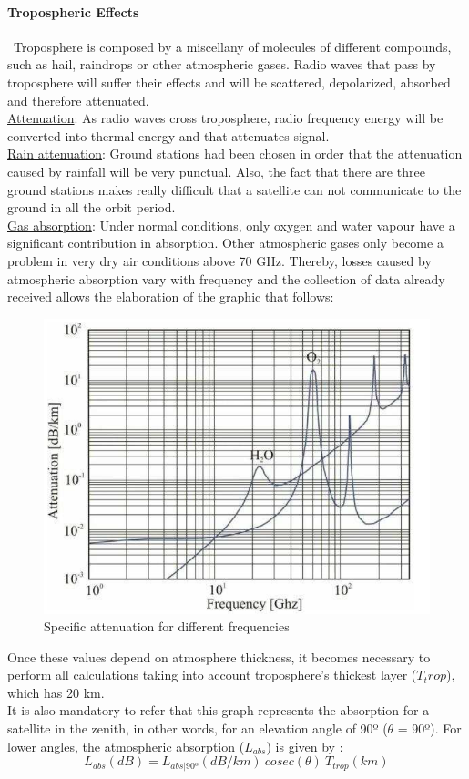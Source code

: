 \paragraph{Tropospheric Effects \cite{Jorge2012}}
\ Troposphere is composed by a miscellany of molecules of different compounds, such as hail, raindrops or other atmospheric gases. Radio waves that pass by troposphere will suffer their effects and will be scattered, depolarized, absorbed and therefore attenuated.\\
\underline{Attenuation}: As radio waves cross troposphere, radio frequency energy will be converted into thermal energy and that attenuates signal.\\
\underline{Rain attenuation}: Ground stations had been chosen in order that the attenuation caused by rainfall will be very punctual. Also, the fact that there are three ground stations makes really difficult that a satellite can not communicate to the ground in all the orbit period.\\
\underline{Gas absorption}: Under normal conditions, only oxygen and water vapour have a significant contribution
in absorption. Other atmospheric gases only become a problem in very dry air
conditions above 70 GHz.
Thereby, losses caused by atmospheric absorption vary with frequency and the
collection of data already received allows the elaboration of the graphic that follows:
\begin{figure}[h]
	\includegraphics[scale=0.7]{./sections/SatelliteDesign/images/specificAttenuation}
	\centering
	\caption{Specific attenuation for different frequencies \cite{Jorge2012}}
	\label{specificAtenuattion}
\end{figure}
Once these values depend on atmosphere thickness, it becomes necessary to perform all calculations taking into account troposphere’s thickest layer ($T_trop$), which has 20 km.\\
It is also mandatory to refer that this graph represents the absorption for a satellite in the zenith, in other words, for an elevation angle of 90º ($\theta$ = 90º). For lower angles, the atmospheric absorption ($L_{abs}$) is given by \cite{Jorge2012}:
\begin{equation}
	L_{abs}(dB)=L_{abs|90º} (dB/km)\ cosec(\theta)\ T_{trop}(km)
	\label{Labs}
\end{equation}

